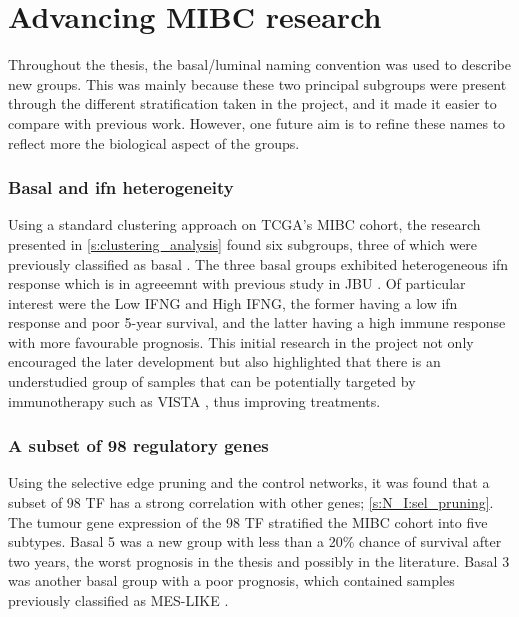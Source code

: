 \section{Advancing MIBC research}

Throughout the thesis, the basal/luminal naming convention was used to describe new groups. This was mainly because these two principal subgroups were present through the different stratification taken in the project, and it made it easier to compare with previous work. However, one future aim is to refine these names to reflect more the biological aspect of the groups.

\subsubsection*{Basal and \acrlong{ifn} heterogeneity}

Using a standard clustering approach on TCGA's MIBC cohort, the research presented in \cref{s:clustering_analysis} found six subgroups, three of which were previously classified as basal \citep{Kamoun2020-tj, Robertson2017-mg, Marzouka2018-ge}. The three basal groups exhibited heterogeneous \acrshort{ifn} response which is in agreeemnt with previous study in JBU \citep{Baker2022-bj}. Of particular interest were the Low IFNG and High IFNG, the former having a low \acrshort{ifn} response and poor 5-year survival, and the latter having a high immune response with more favourable prognosis. This initial research in the project not only encouraged the later development but also highlighted that there is an understudied group of samples that can be potentially targeted by immunotherapy such as VISTA \citep{Baker2022-bj}, thus improving treatments.


\subsubsection*{A subset of 98 regulatory genes}

Using the selective edge pruning and the control networks, it was found that a subset of 98 TF has a strong correlation with other genes; \cref{s:N_I:sel_pruning}. The tumour gene expression of the 98 TF stratified the MIBC cohort into five subtypes. Basal 5 was a new group with less than a 20\% chance of survival after two years, the worst prognosis in the thesis and possibly in the literature. Basal 3 was another basal group with a poor prognosis, which contained samples previously classified as \gls{MES-LIKE} \citep{Marzouka2018-ge}.


